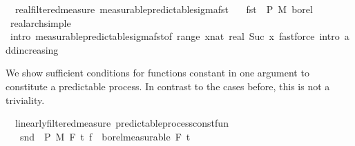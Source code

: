 \begin{isabellebody}
\endisatagproof
{\isafoldproof}%
%
\isadelimproof
\isanewline
%
\endisadelimproof
\isanewline
{}\isamarkupfalse%
\ {\isacharparenleft}{\kern0pt}\ real{\isacharunderscore}{\kern0pt}filtered{\isacharunderscore}{\kern0pt}measure{\isacharparenright}{\kern0pt}\ measurable{\isacharunderscore}{\kern0pt}predictable{\isacharunderscore}{\kern0pt}sigma{\isacharunderscore}{\kern0pt}fst{\isacharprime}{\kern0pt}{\isacharcolon}{\kern0pt}\isanewline
\ \ \ {\isachardoublequoteopen}fst\ {\isasymin}\ {\isasymSigma}\isactrlsub P\ {\isasymrightarrow}\isactrlsub M\ borel{\isachardoublequoteclose}\isanewline
%
\isadelimproof
\ \ %
\endisadelimproof
%
\isatagproof
{}\isamarkupfalse%
\ real{\isacharunderscore}{\kern0pt}arch{\isacharunderscore}{\kern0pt}simple\ \isamarkupfalse%
\ {\isacharparenleft}{\kern0pt}intro\ measurable{\isacharunderscore}{\kern0pt}predictable{\isacharunderscore}{\kern0pt}sigma{\isacharunderscore}{\kern0pt}fst{\isacharbrackleft}{\kern0pt}of\ {\isachardoublequoteopen}range\ {\isacharparenleft}{\kern0pt}{\isasymlambda}x{\isacharcolon}{\kern0pt}{\isacharcolon}{\kern0pt}nat{\isachardot}{\kern0pt}\ {\isacharbraceleft}{\kern0pt}{}{\isacharless}{\kern0pt}{\isachardot}{\kern0pt}{\isachardot}{\kern0pt}real\ {\isacharparenleft}{\kern0pt}Suc\ x{\isacharparenright}{\kern0pt}{\isacharbraceright}{\kern0pt}{\isacharparenright}{\kern0pt}{\isachardoublequoteclose}{\isacharbrackright}{\kern0pt}{\isacharparenright}{\kern0pt}\ {\isacharparenleft}{\kern0pt}fastforce\ intro{\isacharcolon}{\kern0pt}\ add{\isacharunderscore}{\kern0pt}increasing{\isacharparenright}{\kern0pt}{\isacharplus}{\kern0pt}%
\endisatagproof
{\isafoldproof}%
%
\isadelimproof
%
\endisadelimproof
%
\begin{isamarkuptext}%
We show sufficient conditions for functions constant in one argument to constitute a predictable process. In contrast to the cases before, this is not a triviality.%
\end{isamarkuptext}\isamarkuptrue%
\isamarkupfalse%
\ {\isacharparenleft}{\kern0pt}\ linearly{\isacharunderscore}{\kern0pt}filtered{\isacharunderscore}{\kern0pt}measure{\isacharparenright}{\kern0pt}\ predictable{\isacharunderscore}{\kern0pt}process{\isacharunderscore}{\kern0pt}const{\isacharunderscore}{\kern0pt}fun{\isacharcolon}{\kern0pt}\isanewline
\ \ \ {\isachardoublequoteopen}snd\ {\isasymin}\ {\isasymSigma}\isactrlsub P\ {\isasymrightarrow}\isactrlsub M\ F\ t\ {\isachardoublequoteopen}f\ {\isasymin}\ borel{\isacharunderscore}{\kern0pt}measurable\ {\isacharparenleft}{\kern0pt}F\ t\isanewline

\end{isabellebody}
